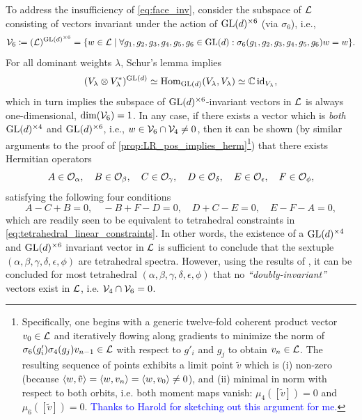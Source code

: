 \documentclass[notitlepage, 10pt]{article}
\begin{document}
\begin{rem}
    To address the insufficiency of \cref{eq:face_inv}, consider the subspace of $\mathcal L$ consisting of vectors invariant under the action of $\operatorname{GL}(d)^{\times 6}$ (via $\sigma_6$), i.e.,
    \begin{equation}
        \mathcal V_{6} \coloneqq (\mathcal L)^{\operatorname{GL}(d)^{\times 6}} = \{ w \in \mathcal L \mid \forall g_1, g_2, g_3, g_4,g_5,g_6 \in \operatorname{GL}(d) : \sigma_{6}(g_1, g_2, g_3, g_4, g_5, g_6) w = w \}.
    \end{equation}
    For all dominant weights $\lambda$, Schur's lemma implies
    \begin{equation}
        (V_{\lambda} \otimes V_{\lambda}^{*})^{\operatorname{GL}(d)} \simeq \operatorname{Hom}_{\operatorname{GL}(d)}(V_{\lambda}, V_{\lambda}) \simeq \mathbb C \operatorname{id}_{V_\lambda},
    \end{equation}
    which in turn implies the subspace of $\operatorname{GL}(d)^{\times 6}$-invariant vectors in $\mathcal L$ is always one-dimensional, $\dim (\mathcal V_{6}) = 1$.
    In any case, if there exists a vector which is \textit{both} $\operatorname{GL}(d)^{\times 4}$ and $\operatorname{GL}(d)^{\times 6}$, i.e., $w \in \mathcal V_{6} \cap \mathcal V_{4} \neq 0$, then it can be shown (by similar arguments to the proof of \cref{prop:LR_pos_implies_herm}\footnote{Specifically, one begins with a generic twelve-fold coherent product vector $v_0 \in \mathcal L$ and iteratively flowing along gradients to minimize the norm of $\sigma_{6}(g'_i)\sigma_{4}(g_j)v_{n-1} \in \mathcal L$ with respect to $g'_i$ and $g_j$ to obtain $v_{n} \in \mathcal L$. The resulting sequence of points exhibits a limit point $\tilde v$ which is (i) non-zero (because $\braket{w, \tilde v} = \braket{w, v_n} = \braket{w, v_0} \neq 0$), and (ii) minimal in norm with respect to both orbits, i.e. both moment maps vanish: $\mu_4([\tilde v]) = 0$ and $\mu_{6}([\tilde v]) = 0$. \textcolor{blue}{Thanks to Harold for sketching out this argument for me.}}) that there exists Hermitian operators
    \begin{equation}
        A \in \mathcal O_{\alpha}, \quad
        B \in \mathcal O_{\beta}, \quad
        C \in \mathcal O_{\gamma}, \quad
        D \in \mathcal O_{\delta}, \quad
        E \in \mathcal O_{\epsilon}, \quad
        F \in \mathcal O_{\phi},
    \end{equation}
    satisfying the following four conditions
    \begin{equation}
        A - C + B = 0, \quad
        - B + F - D = 0, \quad
        D + C - E = 0, \quad
        E - F - A = 0,
    \end{equation}
    which are readily seen to be equivalent to tetrahedral constraints in \cref{eq:tetrahedral_linear_constraints}.
    In other words, the existence of a $\operatorname{GL}(d)^{\times 4}$ and $\operatorname{GL}(d)^{\times 6}$ invariant vector in $\mathcal L$ is sufficient to conclude that the sextuple $(\alpha,\beta,\gamma, \delta, \epsilon, \phi)$ are tetrahedral spectra.
    However, using the results of \cite{roberts1999classical}, it can be concluded for most tetrahedral $(\alpha, \beta, \gamma, \delta, \epsilon, \phi)$ that no \textit{``doubly-invariant''} vectors exist in $\mathcal L$, i.e. $\mathcal V_{4} \cap \mathcal V_{6} = 0$.
\end{rem}
\end{document}
